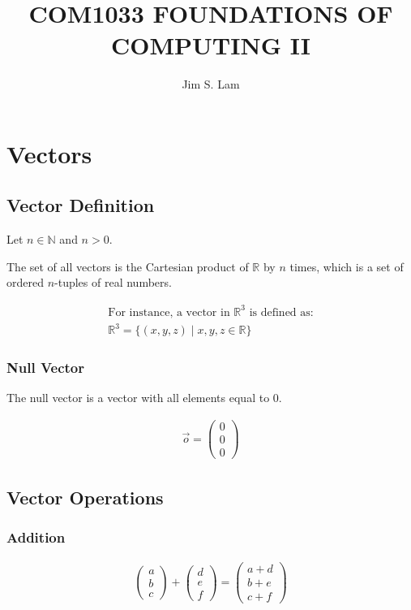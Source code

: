 \documentclass{article}
\author{Jim S. Lam}
\begin{document}
\title{COM1033 FOUNDATIONS OF COMPUTING II}
\maketitle
\tableofcontents
\pagebreak

\section{Vectors}
\subsection{Vector Definition}

Let $n \in \mathbb{N}$ and $n > 0$.

The set of all vectors is the Cartesian product of $\mathbb{R}$ by $n$ times, which is a set of ordered $n$-tuples of real numbers.

\begin{align*}
    \text{For instance, a vector in } \mathbb{R}^3 \text{ is defined as:} \\
    \mathbb{R}^3 = \{ (x, y, z) \mid x, y, z \in \mathbb{R} \}
\end{align*}

\subsubsection*{Null Vector}

The null vector is a vector with all elements equal to 0.

\begin{align*}
    \vec{o} = \begin{pmatrix} 0 \\ 0 \\ 0 \end{pmatrix}
\end{align*}

\subsection{Vector Operations}
\subsubsection{Addition}
\begin{align*}
    \begin{pmatrix} a \\ b \\ c \end{pmatrix} + \begin{pmatrix} d \\ e \\ f \end{pmatrix} = \begin{pmatrix} a + d \\ b + e \\ c + f \end{pmatrix}
\end{align*}
\end{document}
